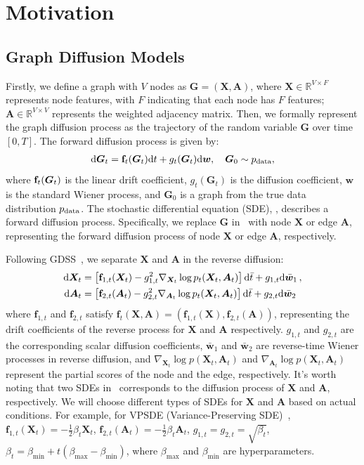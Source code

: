\documentclass{article}
\newcommand{\D}{{\rm{d}}}
\newcommand{\w}{{{\bm w}}}
\newcommand{\f}{{{\bf f}}}
\newcommand{\X}{{{\bm X}}}
\newcommand{\A}{{{\bm A}}}
\newcommand{\G}{{{\bm G}}}
\begin{document}
\section{Motivation}
\subsection{Graph Diffusion Models}
Firstly, we define a graph with $V$ nodes as $\G=(\X,{\A})$, where $\X\in\mathbb{R}^{V\times F}$ represents node features, with $F$ indicating that each node has $F$ features; ${\A}\in\mathbb{R}^{V\times V}$ represents the weighted adjacency matrix. Then, we formally represent the graph diffusion process as the trajectory of the random variable $\G$ over time $[0,T]$. The forward diffusion process is given by:
\begin{align}
\D \G_t
=\f_t(\G_t)\D t+
g_t(\G_t)\D\w,\quad\G_0\sim p_{\rm data},
\label{eq1}
\end{align}
where $\f_t(\G_t)$ is the linear drift coefficient, $g_t(\G_t)$ is the diffusion coefficient, $\w$ is the standard Wiener process, and $\G_0$ is a graph from the true data distribution $p_{\rm data}$. The stochastic differential equation (SDE), , describes a forward diffusion process. Specifically, we replace $\G$ in~ with node $\X$ or edge ${\A}$, representing the forward diffusion process of node $\X$ or edge ${\A}$, respectively.

Following GDSS~\citep{jo2022GDSS}, we separate $\X$ and ${\A}$ in the reverse diffusion:
\begin{equation}
\begin{aligned}
\D\X_t &= \left[\mathbf{f}_{1,t}(\X_t)-g_{1,t}^2\nabla_{\X_t}\log p_t(\X_t,{\A}_t)\right]\D\bar{t} + g_{1,t}\D\bar{\w }_1\,, \\
\D{\A}_t &= \left[\mathbf{f}_{2,t}({\A}_t)-g_{2,t}^2\nabla_{{\A}_t}\log p_t(\X_t,{\A}_t)\right]\D\bar{t} + g_{2,t}\D\bar{\w }_2
\end{aligned}\label{eq2}
\end{equation}
where $\mathbf{f}_{1,t}$ and $\mathbf{f}_{2,t}$ satisfy $\mathbf{f}_t(\X,{\A})=(\mathbf{f}_{1,t}(\X),\mathbf{f}_{2,t}({\A}))$, representing the drift coefficients of the reverse process for $\X$ and $\A$ respectively. $g_{1,t}$ and $g_{2,t}$ are the corresponding scalar diffusion coefficients, $\bar{\w }_1$ and $\bar{\w }_2$ are reverse-time Wiener processes in reverse diffusion, and $\nabla_{\X_t}\log p\left(\X_t,{\A}_t\right)$ and $\nabla_{{\A}_t}\log p\left(\X_t,{\A}_t\right)$ represent the partial scores of the node and the edge, respectively. It's worth noting that two SDEs in~ corresponds to the diffusion process of $\X$ and ${\A}$, respectively. We will choose different types of SDEs for $\X$ and $\A$ based on actual conditions. For example, for VPSDE (Variance-Preserving SDE)~\citep{song2021scorebased}, $\mathbf{f}_{1,t}(\X_t)=-\frac{1}{2}\beta_{t}\X_t$, $\mathbf{f}_{2,t}({\A}_t)=-\frac{1}{2}\beta_{t}{\A}_t$, $g_{1,t} =g_{2,t}= \sqrt{\beta_{t}}$, $\beta_{t}=\beta_{\min}+t(\beta_{\max}-\beta_{\min})$, where $\beta_{\max}$ and $\beta_{\min}$ are hyperparameters.
\end{document}
